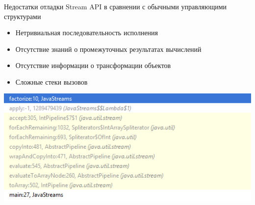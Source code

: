 \begin{frame}
\frametitle{\insertsection} 
\framesubtitle{\insertsubsection}
Недостатки отладки Stream API в сравнении с обычными управляющими структурами
\begin{itemize}
	\item Нетривиальная последовательность исполнения
	\item Отсутствие знаний о промежуточных результатах вычислений 
	\item Отсутствие информации о трансформации объектов
	\item Сложные стеки вызовов
\end{itemize}

\includegraphics[scale=0.6]{img/stack-trace.png}
\end{frame}
